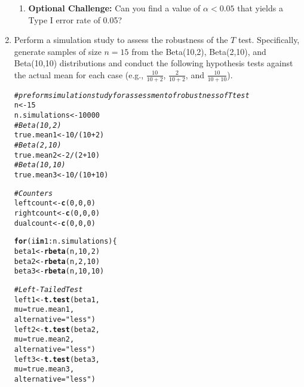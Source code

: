 \documentclass{article}\usepackage[]{graphicx}\usepackage[]{xcolor}
\makeatletter
\newcommand{\hlnum}[1]{\textcolor[rgb]{0.686,0.059,0.569}{#1}}%
\newcommand{\hlsng}[1]{\textcolor[rgb]{0.192,0.494,0.8}{#1}}%
\newcommand{\hlcom}[1]{\textcolor[rgb]{0.678,0.584,0.686}{\textit{#1}}}%
\newcommand{\hlopt}[1]{\textcolor[rgb]{0,0,0}{#1}}%
\newcommand{\hldef}[1]{\textcolor[rgb]{0.345,0.345,0.345}{#1}}%
\newcommand{\hlkwa}[1]{\textcolor[rgb]{0.161,0.373,0.58}{\textbf{#1}}}%
\newcommand{\hlkwb}[1]{\textcolor[rgb]{0.69,0.353,0.396}{#1}}%
\newcommand{\hlkwc}[1]{\textcolor[rgb]{0.333,0.667,0.333}{#1}}%
\newcommand{\hlkwd}[1]{\textcolor[rgb]{0.737,0.353,0.396}{\textbf{#1}}}%
\newenvironment{kframe}{%
 \def\at@end@of@kframe{}%
 \ifinner\ifhmode%
  \def\at@end@of@kframe{\end{minipage}}%
  \begin{minipage}{\columnwidth}%
 \fi\fi%
 \def\FrameCommand##1{\hskip\@totalleftmargin \hskip-\fboxsep
 \colorbox{shadecolor}{##1}\hskip-\fboxsep
     \hskip-\linewidth \hskip-\@totalleftmargin \hskip\columnwidth}%
 \MakeFramed {\advance\hsize-\width
   \@totalleftmargin\z@ \linewidth\hsize
   \@setminipage}}%
 {\par\unskip\endMakeFramed%
 \at@end@of@kframe}
\newenvironment{knitrout}{}{} %
\makeatother
\begin{document}
\begin{enumerate}
\begin{enumerate}
  \item \textbf{Optional Challenge:} Can you find a value of $\alpha<0.05$ that yields a 
  Type I error rate of 0.05?
\end{enumerate}
  \item Perform a simulation study to assess the robustness of the $T$ test. 
  Specifically, generate samples of size $n=15$ from the Beta(10,2), Beta(2,10), 
  and Beta(10,10) distributions and conduct the following hypothesis tests against 
  the actual mean for each case (e.g., $\frac{10}{10+2}$, $\frac{2}{10+2}$, and 
  $\frac{10}{10+10}$). 
\begin{knitrout}
\color{fgcolor}\begin{kframe}
\begin{alltt}
  \hlcom{# preform simulation study for assessment of robustness of T test}
\hldef{n} \hlkwb{<-} \hlnum{15}
\hldef{n.simulations} \hlkwb{<-} \hlnum{10000}
\hlcom{# Beta (10,2)}
\hldef{true.mean1} \hlkwb{<-} \hlnum{10}\hlopt{/}\hldef{(}\hlnum{10}\hlopt{+}\hlnum{2}\hldef{)}
\hlcom{# Beta (2,10)}
\hldef{true.mean2} \hlkwb{<-} \hlnum{2}\hlopt{/}\hldef{(}\hlnum{2}\hlopt{+}\hlnum{10}\hldef{)}
\hlcom{# Beta (10,10)}
\hldef{true.mean3} \hlkwb{<-} \hlnum{10}\hlopt{/}\hldef{(}\hlnum{10}\hlopt{+}\hlnum{10}\hldef{)}

\hlcom{# Counters}
\hldef{leftcount} \hlkwb{<-} \hlkwd{c}\hldef{(}\hlnum{0}\hldef{,}\hlnum{0}\hldef{,}\hlnum{0}\hldef{)}
\hldef{rightcount} \hlkwb{<-} \hlkwd{c}\hldef{(}\hlnum{0}\hldef{,}\hlnum{0}\hldef{,}\hlnum{0}\hldef{)}
\hldef{dualcount} \hlkwb{<-} \hlkwd{c}\hldef{(}\hlnum{0}\hldef{,}\hlnum{0}\hldef{,}\hlnum{0}\hldef{)}

\hlkwa{for} \hldef{(i} \hlkwa{in} \hlnum{1}\hlopt{:}\hldef{n.simulations)\{}
  \hldef{beta1} \hlkwb{<-} \hlkwd{rbeta}\hldef{(n,} \hlnum{10}\hldef{,} \hlnum{2}\hldef{)}
  \hldef{beta2} \hlkwb{<-} \hlkwd{rbeta}\hldef{(n,} \hlnum{2}\hldef{,} \hlnum{10}\hldef{)}
  \hldef{beta3} \hlkwb{<-} \hlkwd{rbeta}\hldef{(n,} \hlnum{10}\hldef{,} \hlnum{10}\hldef{)}

  \hlcom{# Left-Tailed Test}
  \hldef{left1} \hlkwb{<-} \hlkwd{t.test}\hldef{(beta1,}
                  \hlkwc{mu} \hldef{= true.mean1,}
                  \hlkwc{alternative} \hldef{=} \hlsng{"less"}\hldef{)}
  \hldef{left2} \hlkwb{<-} \hlkwd{t.test}\hldef{(beta2,}
                  \hlkwc{mu} \hldef{= true.mean2,}
                  \hlkwc{alternative} \hldef{=} \hlsng{"less"}\hldef{)}
  \hldef{left3} \hlkwb{<-} \hlkwd{t.test}\hldef{(beta3,}
                  \hlkwc{mu} \hldef{= true.mean3,}
                  \hlkwc{alternative} \hldef{=} \hlsng{"less"}\hldef{)}


\end{alltt}
\end{kframe}
\end{knitrout}
\end{enumerate}
\end{document}
